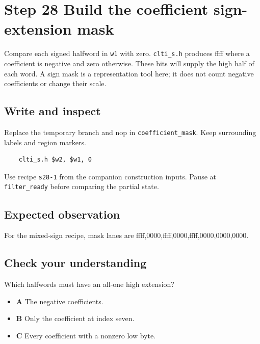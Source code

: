 \section{Step 28 Build the coefficient sign-extension mask}\label{fir-s28}

Compare each signed halfword in \texttt{w1} with zero. \texttt{clti\_s.h} produces ffff where a coefficient is negative and zero otherwise. These bits will supply the high half of each word. A sign mask is a representation tool here; it does not count negative coefficients or change their scale.

\subsection{Write and inspect}
Replace the temporary branch and nop in \texttt{coefficient\_mask}. Keep surrounding labels and region markers.

\begin{verbatim}
    clti_s.h $w2, $w1, 0
\end{verbatim}
Use recipe \texttt{s28-1} from the companion construction inputs. Pause at \texttt{filter\_ready} before comparing the partial state.

\subsection{Expected observation}
For the mixed-sign recipe, mask lanes are ffff,0000,ffff,0000,ffff,0000,0000,0000.

\subsection{Check your understanding}
Which halfwords must have an all-one high extension?

\begin{itemize}
\item \textbf{A} The negative coefficients.
\item \textbf{B} Only the coefficient at index seven.
\item \textbf{C} Every coefficient with a nonzero low byte.
\end{itemize}
